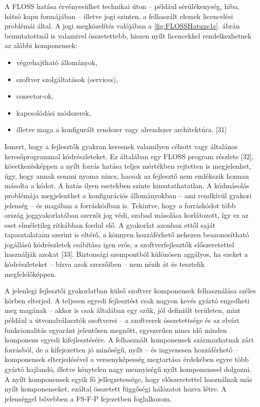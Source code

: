 \documentclass[12pt,magyar,a4paper,oneside]{scrreprt}
\providecommand{\tightlist}{%
  \setlength{\itemsep}{0pt}\setlength{\parskip}{0pt}}
\begin{document}
A FLOSS hatása érvényesülhet technikai úton -- például sérülékenység,
hiba, hátsó kapu formájában -- illetve jogi szinten, a felhaszált elemek
licencelési problémái által. A jogi megközelítés valójában a
\ref{fig:FLOSSHatuxe1s}. ábrán bemutatottnál is valamivel összetettebb,
hiszen nyílt licencekkel rendelkezhetnek az alábbi komponensek:

\begin{itemize}
\tightlist
\item
  végrehajtható állományok,
\item
  szoftver szolgáltatások (services),
\item
  conector-ok,
\item
  kapcsolódási módszerek,
\item
  illetve maga a konfigurált rendszer vagy alrendszer architektúra.
  {[}31{]}
\end{itemize}

Ismert, hogy a fejlesztők gyakran keresnek valamilyen célzott vagy
általános keresőprogrammal kódrészleteket. Ez általában egy FLOSS
program részlete {[}32{]}, következésképpen a nyílt forrás hatása teljes
mértékben rejtetten is megjelenhet, úgy, hogy annak semmi nyoma nincs,
hacsak az fejlesztő nem emlékszik honnan másolta a kódot. A hatás ilyen
esetekben szinte kimutathatatlan. A kódmásolás problémája megjelenthet a
konfigurációs állományokban -- ami rendkívül gyakori jelenség -- és
magában a forráskódban is. Tekintve, hogy a forráskódot több ország
joggyakorlatában szerzői jog védi, szabad másolása korlátozott, így ez
az eset elméletileg ritkábban fordul elő. A gyakorlat azonban ettől
saját tapasztalataim szerint is eltérő, a könnyen hozzáférhető nehezen
beazonosítható jogállású kódrészletek csábítása igen erős, a
szoftverfejlesztők előszeretettel használják azokat {[}33{]}. Biztonsági
szempontból különösen aggályos, ha ezeket a kódrészleteket -- bízva azok
szerzőiben -- nem nézik át és tesztelik megfelelőképpen.

A jelenlegi fejlesztői gyakorlatban külső szoftver komponensek
felhasználása széles körben elterjed. A teljesen egyedi fejlesztést csak
nagyon kevés gyártó engedheti meg magának -- akkor is csak általában egy
szűk, jól definiált területen, mint például a útvonalválasztók
szoftverei -- a szoftverek összetettsége és az elvárt funkcionalitás
egyaránt jelentősen megnőtt, egyszerűen nincs idő minden komponens
egyedi kifejlesztésére. A felhasznált komponensek származhatnak zárt
forrásból, de a kifejezetten jó minőségű, nyílt -- és ingyenesen
hozzáférhető -- komponensek elterjedésével a versenyképesség megtartása
érdekében egyre több gyártó hajlandó, illetve kénytelen nagy mennyiségű
nyílt komponenssel dolgozni. A nyílt komponensek egyik fő
jellegzetessége, hogy előszeretettel használnak más nyílt komponenseket,
ezáltal összetett függőségi hálózatot hozva létre. A jelenséggel
bővebben a FS-F-P fejezetben foglalkozom.
\end{document}
